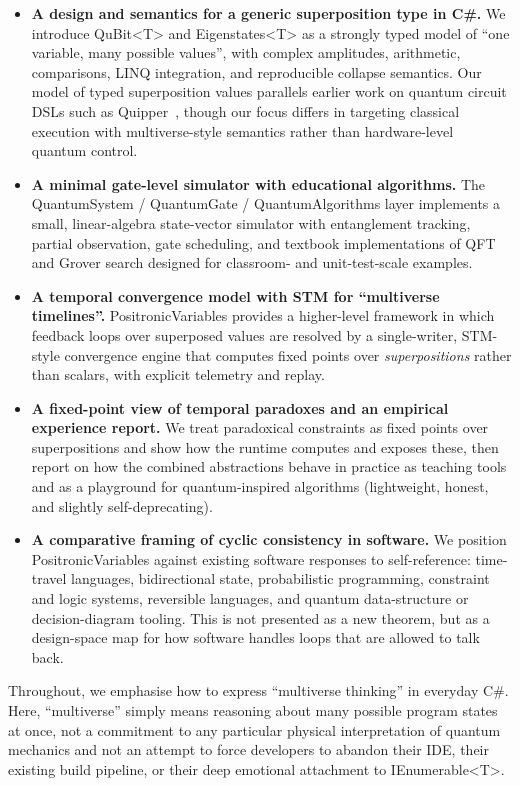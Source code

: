 \documentclass[a4paper,11pt]{article}
\begin{document}
\begin{itemize}
\item
\textbf{A design and semantics for a generic superposition type in C\#.}
We introduce QuBit\textless T\textgreater{} and Eigenstates\textless T\textgreater{} as a strongly typed model of ``one variable, many possible values'', with complex amplitudes, arithmetic, comparisons, LINQ integration, and reproducible collapse semantics.
Our model of typed superposition values parallels earlier work on quantum circuit DSLs such as Quipper~\parencite{Green13Quipper}, though our focus differs in targeting classical execution with multiverse-style semantics rather than hardware-level quantum control.
\item
\textbf{A minimal gate-level simulator with educational algorithms.}
The QuantumSystem / QuantumGate / QuantumAlgorithms layer implements a small, linear-algebra state-vector simulator with entanglement tracking, partial observation, gate scheduling, and textbook implementations of QFT and Grover search designed for classroom- and unit-test-scale examples.
\item
\textbf{A temporal convergence model with STM for ``multiverse timelines''.}
PositronicVariables provides a higher-level framework in which feedback loops over superposed values are resolved by a single-writer, STM-style convergence engine that computes fixed points over \emph{superpositions} rather than scalars, with explicit telemetry and replay.
\item
\textbf{A fixed-point view of temporal paradoxes and an empirical experience report.}
We treat paradoxical constraints as fixed points over superpositions and show how the runtime computes and exposes these, then report on how the combined abstractions behave in practice as teaching tools and as a playground for quantum-inspired algorithms (lightweight, honest, and slightly self-deprecating).
\item
\textbf{A comparative framing of cyclic consistency in software.}
We position PositronicVariables against existing software responses to self-reference:
time-travel languages, bidirectional state, probabilistic programming, constraint and
logic systems, reversible languages, and quantum data-structure or decision-diagram
tooling. This is not presented as a new theorem, but as a design-space map for how
software handles loops that are allowed to talk back.
\end{itemize}

Throughout, we emphasise how to express ``multiverse thinking'' in everyday C\#. Here, ``multiverse'' simply means reasoning about many possible program states at once, not a commitment to any particular physical interpretation of quantum mechanics and not an attempt to force developers to abandon their IDE, their existing build pipeline, or their deep emotional attachment to IEnumerable\textless T\textgreater{}.
\end{document}
